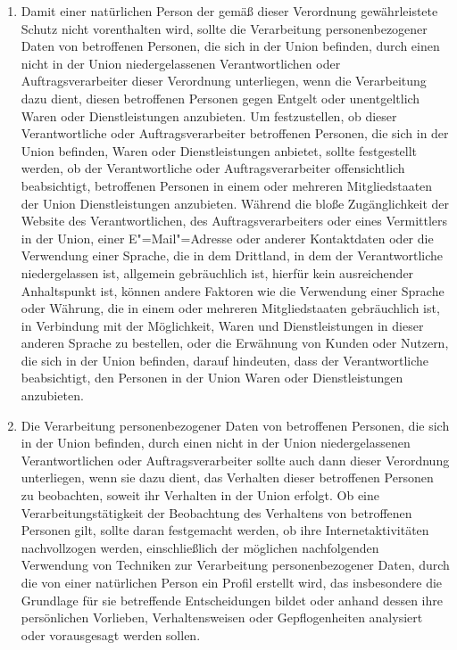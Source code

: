\begin{enumerate}
   \item Damit einer natürlichen Person der gemäß dieser Verordnung gewährleistete Schutz nicht vorenthalten wird,
    sollte die Verarbeitung personenbezogener Daten von betroffenen Personen, die sich in der Union befinden, durch
    einen nicht in der Union niedergelassenen Verantwortlichen oder Auftragsverarbeiter dieser Verordnung unterliegen,
    wenn die Verarbeitung dazu dient, diesen betroffenen Personen gegen Entgelt oder unentgeltlich Waren oder
    Dienstleistungen anzubieten. Um festzustellen, ob dieser Verantwortliche oder Auftragsverarbeiter betroffenen
    Personen, die sich in der Union befinden, Waren oder Dienstleistungen anbietet, sollte festgestellt werden, ob der
    Verantwortliche oder Auftragsverarbeiter offensichtlich beabsichtigt, betroffenen Personen in einem oder mehreren
    Mitgliedstaaten der Union Dienstleistungen anzubieten. Während die bloße Zugänglichkeit der Website des
    Verantwortlichen, des Auftragsverarbeiters oder eines Vermittlers in der Union, einer E"=Mail"=Adresse oder anderer
    Kontaktdaten oder die Verwendung einer Sprache, die in dem Drittland, in dem der Verantwortliche niedergelassen
    ist, allgemein gebräuchlich ist, hierfür kein ausreichender Anhaltspunkt ist, können andere Faktoren wie die
    Verwendung einer Sprache oder Währung, die in einem oder mehreren Mitgliedstaaten gebräuchlich ist, in Verbindung
    mit der Möglichkeit, Waren und Dienstleistungen in dieser anderen Sprache zu bestellen, oder die Erwähnung von
    Kunden oder Nutzern, die sich in der Union befinden, darauf hindeuten, dass der Verantwortliche beabsichtigt, den
    Personen in der Union Waren oder Dienstleistungen anzubieten.%
   \label{itm:eg-23}
   

   \item Die Verarbeitung personenbezogener Daten von betroffenen Personen, die sich in der Union befinden, durch einen
    nicht in der Union niedergelassenen Verantwortlichen oder Auftragsverarbeiter sollte auch dann dieser Verordnung
    unterliegen, wenn sie dazu dient, das Verhalten dieser betroffenen Personen zu beobachten, soweit ihr Verhalten in
    der Union erfolgt. Ob eine Verarbeitungstätigkeit der Beobachtung des Verhaltens von betroffenen Personen gilt,
    sollte daran festgemacht werden, ob ihre Internetaktivitäten nachvollzogen werden, einschließlich der möglichen
    nachfolgenden Verwendung von Techniken zur Verarbeitung personenbezogener Daten, durch die von einer natürlichen
    Person ein Profil erstellt wird, das insbesondere die Grundlage für sie betreffende Entscheidungen bildet oder
    anhand dessen ihre persönlichen Vorlieben, Verhaltensweisen oder Gepflogenheiten analysiert oder vorausgesagt
    werden sollen.%
   \label{itm:eg-24}
   

\end{enumerate}
